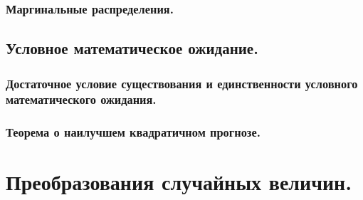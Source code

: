 \subsubsection{Маргинальные распределения.}
\subsection{Условное математическое ожидание.}
\subsubsection{Достаточное условие существования и единственности условного математического ожидания.}
\subsubsection{Теорема о наилучшем квадратичном прогнозе.}
\section{Преобразования случайных величин.}
